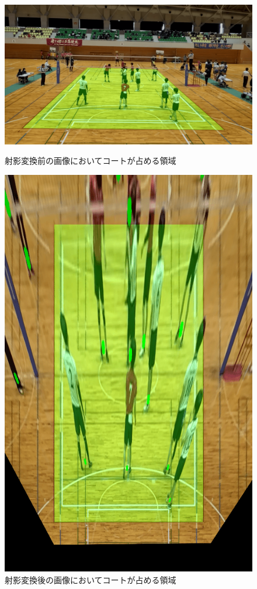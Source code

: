 \documentclass[a4j, fleqn, 12pt]{jsreport}
\begin{document}
            \begin{figure}[ht]
                \begin{minipage}{0.49\hsize}
                    \centering
                    \includegraphics[width=1\hsize]{images/colored_frame.png}
                    \caption{射影変換前の画像においてコートが占める領域}
                    \label{fig:explanation_before}
                \end{minipage}
                \begin{minipage}{0.49\hsize}
                    \centering
                    \includegraphics[width=0.7\hsize]{images/colored_warped.png}
                    \caption{射影変換後の画像においてコートが占める領域}
                    \label{fig:explanation_after}
                \end{minipage}
            \end{figure}
\end{document}
